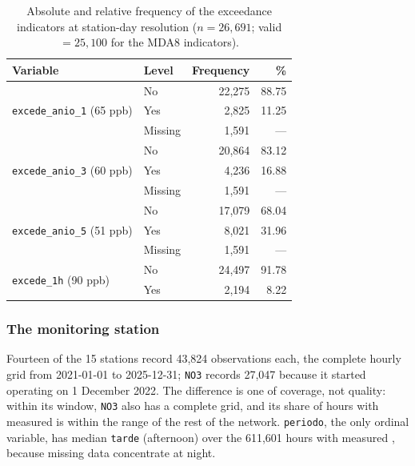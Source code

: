 \begin{table}[pos=t]
  \centering
  \caption{Absolute and relative frequency of the exceedance indicators at
    station-day resolution ($n = 26{,}691$; valid $= 25{,}100$ for the MDA8
    indicators).}
  \label{tab:freq-diaria}
  \small
  \begin{tabular}{llrr}
    \toprule
    Variable & Level & Frequency & \% \\
    \midrule
    \multirow{3}{*}{\texttt{excede\_anio\_1} (65 ppb)}
                                        & No        &  22,275 &  88.75 \\
                                        & Yes       &   2,825 &  11.25 \\
                                        & Missing       &   1,591 &    --- \\
    \midrule
    \multirow{3}{*}{\texttt{excede\_anio\_3} (60 ppb)}
                                        & No        &  20,864 &  83.12 \\
                                        & Yes       &   4,236 &  16.88 \\
                                        & Missing       &   1,591 &    --- \\
    \midrule
    \multirow{3}{*}{\texttt{excede\_anio\_5} (51 ppb)}
                                        & No        &  17,079 &  68.04 \\
                                        & Yes       &   8,021 &  31.96 \\
                                        & Missing       &   1,591 &    --- \\
    \midrule
    \multirow{2}{*}{\texttt{excede\_1h} (90 ppb)}
                                        & No        &  24,497 &  91.78 \\
                                        & Yes       &   2,194 &   8.22 \\
    \bottomrule
  \end{tabular}
\end{table}

\subsubsection{The monitoring station}

Fourteen of the 15 stations record 43,824 observations each, the complete
hourly grid from 2021-01-01 to 2025-12-31; \texttt{NO3} records 27,047
because it started operating on 1 December 2022. The difference is one of
coverage, not quality: within its window, \texttt{NO3} also has a complete
grid, and its share of hours with measured  is within the range of the
rest of the network. \texttt{periodo}, the only ordinal variable, has median
\texttt{tarde} (afternoon) over the 611,601 hours with measured ,
because missing data concentrate at night.

